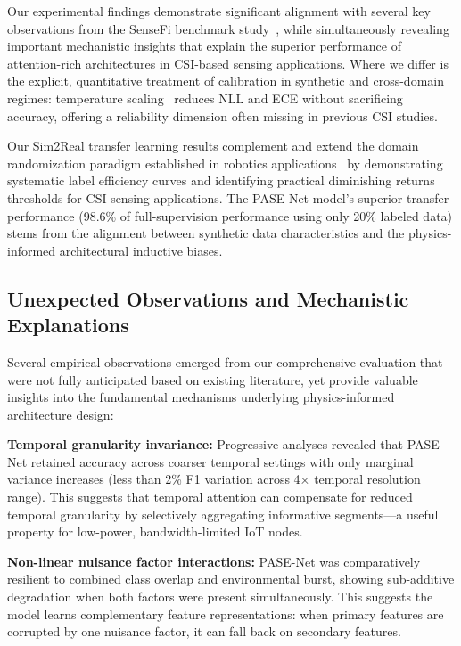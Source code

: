 \documentclass[journal]{IEEEtran}
\begin{document}
Our experimental findings demonstrate significant alignment with several key observations from the SenseFi benchmark study~\cite{yang2023sensefi}, while simultaneously revealing important mechanistic insights that explain the superior performance of attention-rich architectures in CSI-based sensing applications. Where we differ is the explicit, quantitative treatment of calibration in synthetic and cross-domain regimes: temperature scaling~\cite{calibration_guo2017} reduces NLL and ECE without sacrificing accuracy, offering a reliability dimension often missing in previous CSI studies.

Our Sim2Real transfer learning results complement and extend the domain randomization paradigm established in robotics applications~\cite{peng2018sim2real} by demonstrating systematic label efficiency curves and identifying practical diminishing returns thresholds for CSI sensing applications. The PASE-Net model's superior transfer performance (98.6\% of full-supervision performance using only 20\% labeled data) stems from the alignment between synthetic data characteristics and the physics-informed architectural inductive biases.

\subsection{Unexpected Observations and Mechanistic Explanations}

Several empirical observations emerged from our comprehensive evaluation that were not fully anticipated based on existing literature, yet provide valuable insights into the fundamental mechanisms underlying physics-informed architecture design:

\textbf{Temporal granularity invariance:} Progressive analyses revealed that PASE-Net retained accuracy across coarser temporal settings with only marginal variance increases (less than 2\% F1 variation across 4× temporal resolution range). This suggests that temporal attention can compensate for reduced temporal granularity by selectively aggregating informative segments—a useful property for low-power, bandwidth-limited IoT nodes.

\textbf{Non-linear nuisance factor interactions:} PASE-Net was comparatively resilient to combined class overlap and environmental burst, showing sub-additive degradation when both factors were present simultaneously. This suggests the model learns complementary feature representations: when primary features are corrupted by one nuisance factor, it can fall back on secondary features.
\end{document}
